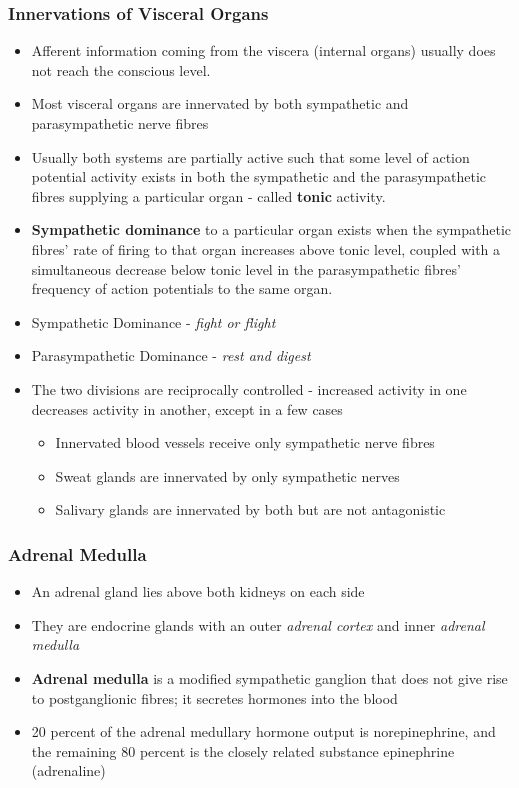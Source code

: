 \documentclass[11pt]{article}
\begin{document}
\subsubsection{Innervations of Visceral Organs}
\begin{itemize}
\item Afferent information coming from the viscera (internal organs) usually does not reach the conscious level.
\item Most visceral organs are innervated by both sympathetic and parasympathetic nerve fibres
\item Usually both systems are partially active such that some level of action potential activity exists in both the sympathetic and the parasympathetic fibres supplying a particular organ - called \textbf{tonic} activity. 
\item \textbf{Sympathetic dominance }to a particular organ exists when the sympathetic fibres’ rate of firing to that organ increases above tonic level, coupled with a simultaneous decrease below tonic level in the parasympathetic fibres’ frequency of action potentials to the same organ. 
\item Sympathetic Dominance - \textit{fight or flight}
\item Parasympathetic Dominance - \textit{rest and digest} 
\item The two divisions are reciprocally controlled - increased activity in one decreases activity in another, except in a few cases
\begin{itemize}
\item Innervated blood vessels receive only sympathetic nerve fibres
\item Sweat glands are innervated by only sympathetic nerves
\item Salivary glands are innervated by both but are not antagonistic
\end{itemize}
\end{itemize}

\subsubsection{Adrenal Medulla}
\begin{itemize}
\item An adrenal gland lies above both kidneys on each side
\item They are endocrine glands with an outer \textit{adrenal cortex} and inner \textit{adrenal medulla}
\item \textbf{Adrenal medulla} is a modified sympathetic ganglion that does not give rise to postganglionic fibres; it secretes hormones into the blood
\item 20 percent of the adrenal medullary hormone output is norepinephrine, and the remaining 80 percent is the closely related substance epinephrine (adrenaline)
\end{itemize}
\end{document}
